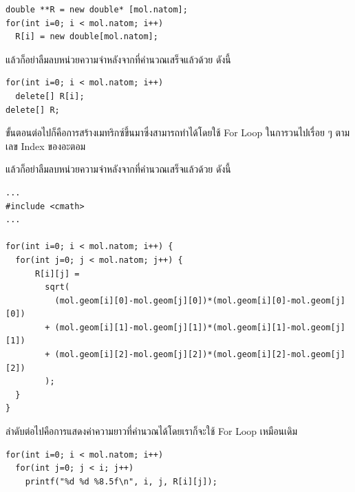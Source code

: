 \begin{lstlisting}[style=MyC++]
double **R = new double* [mol.natom];
for(int i=0; i < mol.natom; i++)
  R[i] = new double[mol.natom];
\end{lstlisting}

\vspace{5pt}

\noindent แล้วก็อย่าลืมลบหน่วยความจำหลังจากที่คำนวณเสร็จแล้วด้วย ดังนี้

\vspace{5pt}

\begin{lstlisting}[style=MyC++]
for(int i=0; i < mol.natom; i++)
  delete[] R[i];
delete[] R;
\end{lstlisting}

\vspace{5pt}

ขั้นตอนต่อไปก็คือการสร้างเมทริกซ์ขึ้นมาซึ่งสามารถทำได้โดยใช้ For Loop ในการวนไปเรื่อย ๆ ตามเลข Index ของอะตอม

\vspace{5pt}

\noindent แล้วก็อย่าลืมลบหน่วยความจำหลังจากที่คำนวณเสร็จแล้วด้วย ดังนี้

\vspace{5pt}

\begin{lstlisting}[style=MyC++]
...
#include <cmath>
...

for(int i=0; i < mol.natom; i++) {
  for(int j=0; j < mol.natom; j++) {
      R[i][j] = 
        sqrt(
          (mol.geom[i][0]-mol.geom[j][0])*(mol.geom[i][0]-mol.geom[j][0])
        + (mol.geom[i][1]-mol.geom[j][1])*(mol.geom[i][1]-mol.geom[j][1])
        + (mol.geom[i][2]-mol.geom[j][2])*(mol.geom[i][2]-mol.geom[j][2]) 
        );
  }
}
\end{lstlisting}

\vspace{5pt}

ลำดับต่อไปคือการแสดงค่าความยาวที่คำนวณได้โดยเราก็จะใช้ For Loop เหมือนเดิม

\vspace{5pt}

\begin{lstlisting}[style=MyC++]
for(int i=0; i < mol.natom; i++)
  for(int j=0; j < i; j++)
    printf("%d %d %8.5f\n", i, j, R[i][j]);
\end{lstlisting}

\vspace{5pt}

